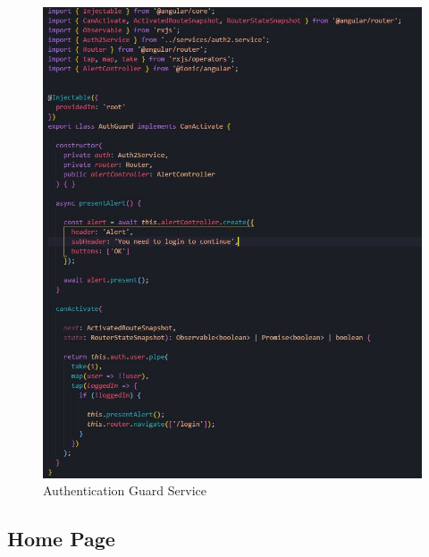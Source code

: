 \documentclass[a4paper,12pt]{article}
\begin{document}
			\newpage
			\begin{figure}[!htb]
				\begin{center}
					\caption{Authentication Guard Service}
					\vspace*{0.5cm}

					\includegraphics[width=0.9\linewidth]{authGuard} 
				\end{center}
			\end{figure}

			\newpage
			\subsection{Home Page}
\end{document}

